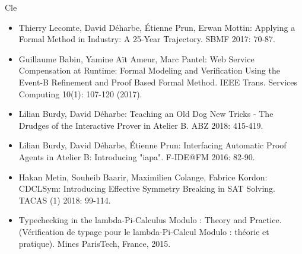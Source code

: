 \begin{sitedescription}{Cle}
\begin{itemize}
\item Thierry Lecomte, David Déharbe, Étienne Prun, Erwan Mottin:
Applying a Formal Method in Industry: A 25-Year Trajectory. SBMF 2017: 70-87.
\item Guillaume Babin, Yamine Aït Ameur, Marc Pantel:
Web Service Compensation at Runtime: Formal Modeling and Verification Using the Event-B Refinement and Proof Based Formal Method. IEEE Trans. Services Computing 10(1): 107-120 (2017).
\item Lilian Burdy, David Déharbe:
Teaching an Old Dog New Tricks - The Drudges of the Interactive Prover in Atelier B. ABZ 2018: 415-419.
\item Lilian Burdy, David Déharbe, Étienne Prun:
Interfacing Automatic Proof Agents in Atelier B: Introducing "iapa". F-IDE@FM 2016: 82-90.
\item Hakan Metin, Souheib Baarir, Maximilien Colange, Fabrice Kordon:
CDCLSym: Introducing Effective Symmetry Breaking in SAT Solving. TACAS (1) 2018: 99-114.
\item Typechecking in the lambda-Pi-Calculus Modulo : Theory and Practice. (Vérification de typage pour le lambda-Pi-Calcul Modulo : théorie et pratique). Mines ParisTech, France, 2015.
\end{itemize}

\end{sitedescription}

